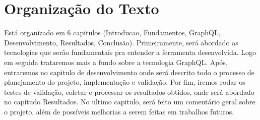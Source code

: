 \section[Organização do Texto]{Organização do Texto}

Está organizado em 6 capitulos (Introducao, Fundamentos, GraphQL, Desenvolvimento, Resultados, Conclusão). Primeiramente, será abordado as tecnologias que serão fundamentais pra entender a ferramenta desenvolvida. Logo em seguida trataremos mais a fundo sobre a tecnologia GraphQL. Após, entraremos no capitulo de desenvolvimento onde será descrito todo o processo de planejamento do projeto, implementação e validação. Por fim, iremos rodar os testes de validação, coletar e processar os resultados obtidos, onde será abordado no capítudo Resultados. No ultimo capitulo, será feito um comentário geral sobre o projeto, além de possíveis melhorias a serem feitas em trabalhos futuros.
